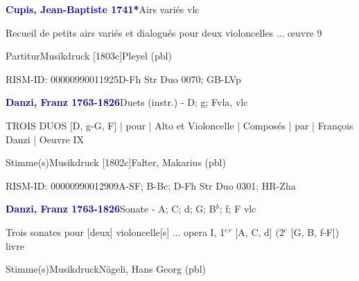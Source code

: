 \documentclass[twocolumn]{book}
\begin{document}
\par \vspace{7pt} \textcolor{darkblue}{\textbf{Cupis, Jean-Baptiste  1741*}}\hfillplus{\textbf{[263]}}\newline Airs variés vlc
\par \begin{itshape}Recueil de petits airs variés et dialogués pour deux violoncelles ... œuvre 9\end{itshape} 
\par \textcolor{darkblue}{}  Partitur\newline Musikdruck  [1803c]\newline Pleyel  (pbl)
\par RISM-ID: 00000990011925\newline D-Fh  Str Duo 0070; GB-LVp
\par \vspace{7pt} \textcolor{darkblue}{\textbf{Danzi, Franz  1763-1826}}\hfillplus{\textbf{[264]}}\newline Duets (instr.) - D; g; F\newline vla, vlc
\par \begin{itshape}TROIS DUOS [D, g-G, F] | pour | Alto et Violoncelle | Composés | par | François Danzi |  Oeuvre IX\end{itshape} 
\par \textcolor{darkblue}{}  Stimme(s)\newline Musikdruck  [1802c]\newline Falter, Makarius  (pbl)
\par RISM-ID: 00000990012909\newline A-SF; B-Bc; D-Fh  Str Duo 0301; HR-Zha
\par \vspace{7pt} \textcolor{darkblue}{\textbf{Danzi, Franz  1763-1826}}\hfillplus{\textbf{[265]}}\newline Sonate - A; C; d; G; B$^b$; f; F vlc
\par \begin{itshape}Trois sonates pour [deux] violoncelle[s] ... opera I, 1$^e$$^r$ [A, C, d] (2$^e$ [G, B, f-F]) livre\end{itshape} 
\par \textcolor{darkblue}{}  Stimme(s)\newline Musikdruck\newline Nägeli, Hans Georg  (pbl)
\end{document}
